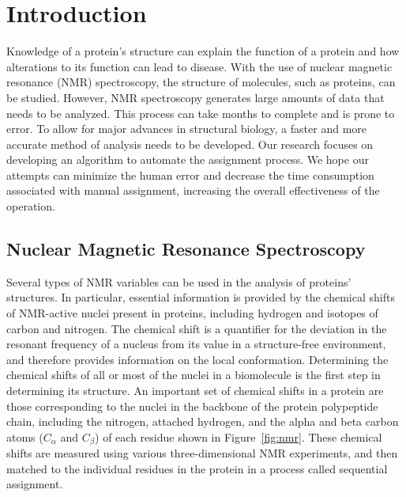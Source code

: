 \documentclass[12pt, letter]{article}
\begin{document}
\section{Introduction}
\label{sub:introduction}
Knowledge of a protein's structure can explain the function of a protein and how alterations to its function can lead to disease. With the use of nuclear magnetic resonance (NMR) spectroscopy, the structure of molecules, such as proteins, can be studied. However, NMR spectroscopy generates large amounts of data that needs to be analyzed. This process can take months to complete and is prone to error. To allow for major advances in structural biology, a faster and more accurate method of analysis needs to be developed. Our research focuses on developing an algorithm to automate the assignment process. We hope our attempts can minimize the human error and decrease the time consumption associated with manual assignment, increasing the overall effectiveness of the operation.

\subsection{Nuclear Magnetic Resonance Spectroscopy} %
\label{sub:nmr}
Several types of NMR variables can be used in the analysis of proteins' structures. In particular, essential information is provided by the chemical shifts of NMR-active nuclei present in proteins, including hydrogen and isotopes of carbon and nitrogen. The chemical shift is a quantifier for the deviation in the resonant frequency of a nucleus from its value in a structure-free environment, and therefore provides information on the local conformation. Determining the chemical shifts of all or most of the nuclei in a biomolecule is the first step in determining its structure. An important set of chemical shifts in a protein are those corresponding to the nuclei in the backbone of the protein polypeptide chain, including the nitrogen, attached hydrogen, and the alpha and beta carbon atoms ($C_\alpha$ and $C_{\beta}$) of each residue shown in Figure~\ref{fig:nmr}. These chemical shifts are measured using various three-dimensional NMR experiments, and then matched to the individual residues in the protein in a process called sequential assignment.
\end{document}
